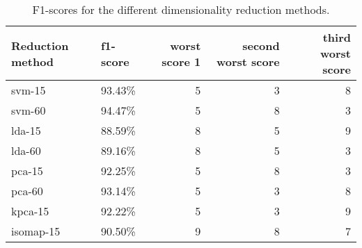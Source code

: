 \begin{table}
    \centering
    \begin{tabular}{llrrr}
        \hline
        Reduction method & f1-score & worst score 1 & second worst score & third worst score \\
        \hline
        \gls{svm}-15 & 93.43\% & 5 & 3 & 8 \\
        \gls{svm}-60 & 94.47\% & 5 & 8 & 3 \\
        \gls{lda}-15 & 88.59\% & 8 & 5 & 9 \\
        \gls{lda}-60 & 89.16\% & 8 & 5 & 3 \\
        \gls{pca}-15 & 92.25\% & 5 & 8 & 3 \\
        \gls{pca}-60 & 93.14\% & 5 & 3 & 8 \\
        \gls{kpca}-15 & 92.22\% & 5 & 3 & 9 \\
        \gls{isomap}-15 & 90.50\% & 9 & 8 & 7 \\
        \hline
    \end{tabular}
    \caption{F1-scores for the different dimensionality reduction methods.}
    \label{tab:discussion-experiment-1-f1-score}
    \end{table}